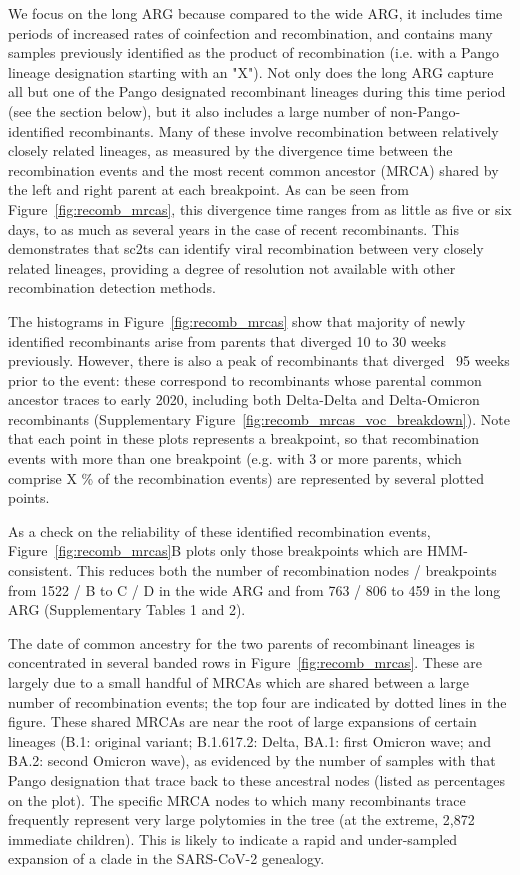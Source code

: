 \documentclass{article}
\begin{document}
We focus on the long ARG because compared to the wide ARG, it includes time
periods of increased rates of coinfection and recombination, and contains many
samples previously identified as the product of recombination (i.e. with a
Pango lineage designation starting with an "X"). Not only does the long ARG
capture all but one of the Pango designated recombinant lineages during this
time period (see the section below), but it also includes a large number of
non-Pango-identified recombinants. Many of these involve recombination between
relatively closely related lineages, as measured by the divergence time between
the recombination events and the most recent common ancestor (MRCA) shared by
the left and right parent at each breakpoint. As can be seen from
Figure~\ref{fig:recomb_mrcas}, this divergence time ranges from as little as
five or six days, to as much as several years in the case of recent
recombinants. This demonstrates that sc2ts can identify viral recombination
between very closely related lineages, providing a degree of resolution not
available with other recombination detection methods.

The histograms in Figure~\ref{fig:recomb_mrcas} show that
majority of newly identified recombinants arise from parents that diverged 10 to 30 weeks previously. However, there is also a peak of recombinants that diverged ~95 weeks prior to the event: these correspond to recombinants whose parental common ancestor traces to early 2020, including both Delta-Delta and Delta-Omicron recombinants (Supplementary Figure~\ref{fig:recomb_mrcas_voc_breakdown}). Note that each point in these plots represents a breakpoint, so that recombination events with more than one breakpoint (e.g. with 3 or more parents, which comprise X \% of the recombination events) are represented by several plotted points.

As a check on the reliability of these identified recombination events,
Figure~\ref{fig:recomb_mrcas}B  plots only those breakpoints which are
HMM-consistent. This reduces both the number of recombination nodes /
breakpoints from 1522 / B to C / D in the wide ARG and from 763 / 806 to 459 in
the long ARG (Supplementary Tables 1 and 2).

The date of common ancestry for the two parents of recombinant lineages is
concentrated in several banded rows in Figure~\ref{fig:recomb_mrcas}. These are
largely due to a small handful of MRCAs which are shared between a large number
of recombination events; the top four are indicated by dotted lines in the
figure. These shared MRCAs are near the root of large expansions of certain
lineages (B.1: original variant;  B.1.617.2: Delta, BA.1: first Omicron wave;
and BA.2: second Omicron wave), as evidenced by the number of samples with that
Pango designation that trace back to these ancestral nodes (listed as
percentages on the plot). The specific MRCA nodes to which many recombinants
trace frequently represent very large polytomies in the tree (at the extreme,
2,872 immediate children). This is likely to indicate a rapid and under-sampled
expansion of a clade in the SARS-CoV-2 genealogy.
\end{document}
